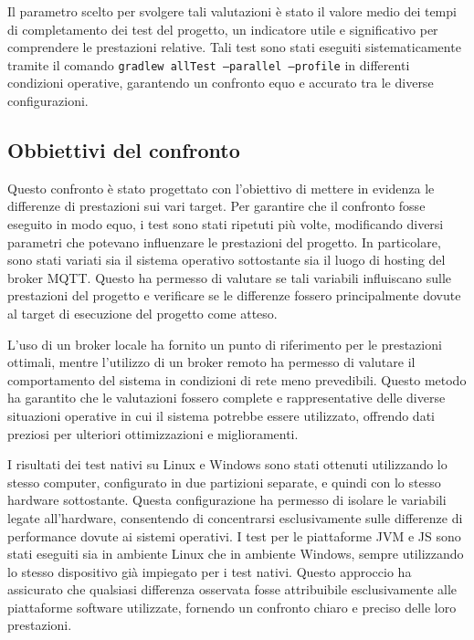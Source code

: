\documentclass[12pt,a4paper,openright,twoside]{book}
\begin{document}
Il parametro scelto per svolgere tali valutazioni è stato il valore medio dei tempi di completamento dei test del progetto, un indicatore utile e significativo 
per comprendere le prestazioni relative. Tali test sono stati eseguiti sistematicamente tramite il comando \texttt{gradlew allTest --parallel --profile} 
in differenti condizioni operative, garantendo un confronto equo e accurato tra le diverse configurazioni.

\subsection{Obbiettivi del confronto}

Questo confronto è stato progettato con l'obiettivo di mettere in evidenza le differenze di prestazioni sui vari target. Per garantire che il confronto fosse eseguito 
in modo equo, i test sono stati ripetuti più volte, modificando diversi parametri che potevano influenzare le prestazioni del progetto. In particolare, 
sono stati variati sia il sistema operativo sottostante sia il luogo di hosting del broker \ac{MQTT}. Questo ha permesso di valutare se tali variabili influiscano 
sulle prestazioni del progetto e verificare se le differenze fossero principalmente dovute al target di esecuzione del progetto come atteso.  

L'uso di un broker locale ha fornito un punto di riferimento per le prestazioni ottimali, mentre l'utilizzo di un broker remoto ha permesso di valutare il comportamento 
del sistema in condizioni di rete meno prevedibili. Questo metodo ha garantito che le valutazioni fossero complete e rappresentative delle diverse situazioni operative 
in cui il sistema potrebbe essere utilizzato, offrendo dati preziosi per ulteriori ottimizzazioni e miglioramenti.

I risultati dei test nativi su Linux e Windows sono stati ottenuti utilizzando lo stesso computer, configurato in due partizioni separate, e quindi con lo stesso hardware 
sottostante. Questa configurazione ha permesso di isolare le variabili legate all'hardware, consentendo di concentrarsi esclusivamente sulle differenze di performance 
dovute ai sistemi operativi. I test per le piattaforme JVM e JS sono stati eseguiti sia in ambiente Linux che in ambiente Windows, sempre utilizzando lo stesso dispositivo 
già impiegato per i test nativi. Questo approccio ha assicurato che qualsiasi differenza osservata fosse attribuibile esclusivamente alle piattaforme software utilizzate, 
fornendo un confronto chiaro e preciso delle loro prestazioni.
\end{document}
